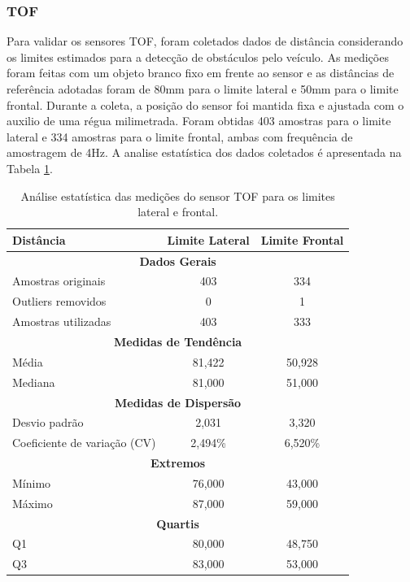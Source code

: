 \subsubsection{TOF}
Para validar os sensores TOF, foram coletados dados de distância considerando os limites estimados para a detecção de obstáculos pelo veículo. As medições foram feitas com um objeto branco fixo em frente ao sensor e as distâncias de referência adotadas foram de 80mm para o limite lateral e 50mm para o limite frontal. Durante a coleta, a posição do sensor foi mantida fixa e ajustada com o auxilio de uma régua milimetrada. Foram obtidas 403 amostras para o limite lateral e 334 amostras para o limite frontal, ambas com frequência de amostragem de 4Hz. A analise estatística dos dados coletados é apresentada na Tabela \ref{tab:tof_stats}. 

\begin{table}[h]
    \centering
       \begin{tabular}{|l|c|c|}
        \hline
        \textbf{Distância} & \textbf{Limite Lateral} & \textbf{Limite Frontal} \\ \hline
        
        \multicolumn{3}{|c|}{\textbf{Dados Gerais}} \\ \hline
        Amostras originais & 403 & 334 \\ \hline
        Outliers removidos & 0 & 1 \\ \hline
        Amostras utilizadas & 403 & 333 \\ \hline
        
        \multicolumn{3}{|c|}{\textbf{Medidas de Tendência}} \\ \hline
        Média & 81,422 & 50,928 \\ \hline
        Mediana & 81,000 & 51,000 \\ \hline
        
        \multicolumn{3}{|c|}{\textbf{Medidas de Dispersão}} \\ \hline
        Desvio padrão & 2,031 & 3,320 \\ \hline
        Coeficiente de variação (CV) & 2,494\% & 6,520\% \\ \hline
        
        \multicolumn{3}{|c|}{\textbf{Extremos}} \\ \hline
        Mínimo & 76,000 & 43,000 \\ \hline
        Máximo & 87,000 & 59,000 \\ \hline
        
        \multicolumn{3}{|c|}{\textbf{Quartis}} \\ \hline
        Q1 & 80,000 & 48,750 \\ \hline
        Q3 & 83,000 & 53,000 \\ \hline
    \end{tabular}
    \caption{Análise estatística das medições do sensor TOF para os limites lateral e frontal.}
    \label{tab:tof_stats}
\end{table}

